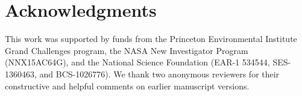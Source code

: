 \documentclass[a4paper]{article}
\begin{document}
\vspace{-0.3 cm}
\section*{Acknowledgments}
\vspace{-0.2 cm}
This work was supported by funds from the Princeton Environmental Institute Grand Challenges program, the NASA New Investigator Program (NNX15AC64G), and the National Science Foundation (EAR-1 534544, SES-1360463, and BCS-1026776). We  thank two anonymous reviewers for their constructive and helpful comments on earlier manuscript versions. 

 
% 
{\footnotesize }

\end{document}
